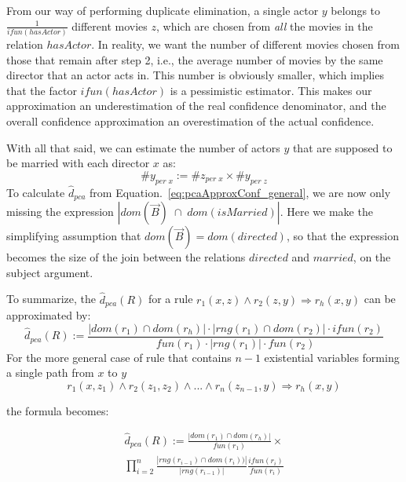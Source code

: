 {From our way of performing duplicate elimination, a single actor $y$ belongs to $\frac{1}{ifun(hasActor)}$ different movies $z$,
which are chosen from \emph{all} the movies in the relation $hasActor$.
In reality, we want the number of different movies chosen from those that remain after step 2, %
i.e., the average number of movies by the same director that an actor acts in. This number is obviously smaller, which
implies that the factor $ifun(hasActor)$ is a pessimistic estimator. This makes
our approximation an underestimation of the real confidence denominator,
and the overall confidence approximation an overestimation of the actual confidence.

With all that said, we can estimate the number of actors $y$ that are supposed to be married with each director $x$ as:
$$
 \#y_{per\;x} :=  \#z_{per \; x} \times \#y_{ per \; z}
$$
\noindent To calculate $\widehat{d}_{pca}$ from Equation.~\ref{eq:pcaApproxConf_general}, we are now only missing
the expression $|dom(\vec{B})\;\cap\;dom(isMarried)|$.
Here we make the simplifying assumption that $dom(\vec{B}) = dom(directed)$, so that the expression
becomes the size of the join between the relations $directed$ and $married$, on the subject argument.

To summarize, the $ \widehat{d}_{pca}(R)$ for a rule $r_1(x,z)\wedge r_2(z,y) \Rightarrow r_h(x,y)$ can be approximated by:
\[
  \widehat{d}_{pca}(R) := \frac{|dom(r_1) \cap dom(r_h)| \cdot |rng(r_1) \cap dom(r_2)| \cdot ifun(r_2)  }{fun(r_1) \cdot |rng(r_1)| \cdot fun(r_2)}
\]
For the more general case of rule that contains $n-1$ existential variables forming a single path from $x$ to $y$
$$
  r_1(x,z_1) \wedge r_2(z_1,z_2) \wedge ... \wedge r_n(z_{n-1},y) \Rightarrow r_h(x,y)
$$

\noindent the formula becomes:

\begin{eqnarray*}
  \widehat{d}_{pca}(R) := \frac{|dom(r_1) \cap dom(r_h)|}{fun(r_1)}  \times \\
  \prod_{i=2}^{n}\frac{|rng(r_{i-1})\cap dom(r_i))|}{|rng(r_{i-1})|}\frac{ifun(r_i)}{fun(r_i)}
\end{eqnarray*}

}
